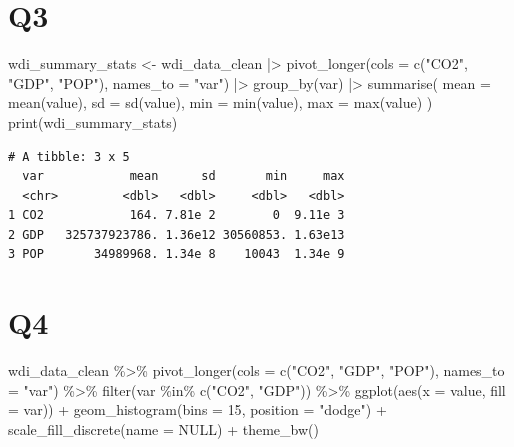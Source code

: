 \documentclass[
  letterpaper,
  DIV=11,
  numbers=noendperiod]{scrartcl}
\newenvironment{Shaded}{\begin{snugshade}}{\end{snugshade}}
\newcommand{\AttributeTok}[1]{\textcolor[rgb]{0.40,0.45,0.13}{#1}}
\newcommand{\ConstantTok}[1]{\textcolor[rgb]{0.56,0.35,0.01}{#1}}
\newcommand{\DecValTok}[1]{\textcolor[rgb]{0.68,0.00,0.00}{#1}}
\newcommand{\FunctionTok}[1]{\textcolor[rgb]{0.28,0.35,0.67}{#1}}
\newcommand{\NormalTok}[1]{\textcolor[rgb]{0.00,0.23,0.31}{#1}}
\newcommand{\OtherTok}[1]{\textcolor[rgb]{0.00,0.23,0.31}{#1}}
\newcommand{\SpecialCharTok}[1]{\textcolor[rgb]{0.37,0.37,0.37}{#1}}
\newcommand{\StringTok}[1]{\textcolor[rgb]{0.13,0.47,0.30}{#1}}
\begin{document}
\section{Q3}\label{q3}

\begin{Shaded}
\begin{Highlighting}[]
\NormalTok{wdi\_summary\_stats }\OtherTok{\textless{}{-}} 
\NormalTok{  wdi\_data\_clean }\SpecialCharTok{|\textgreater{}}
   \FunctionTok{pivot\_longer}\NormalTok{(}\AttributeTok{cols =} \FunctionTok{c}\NormalTok{(}\StringTok{"CO2"}\NormalTok{, }\StringTok{"GDP"}\NormalTok{, }\StringTok{"POP"}\NormalTok{), }\AttributeTok{names\_to =} \StringTok{"var"}\NormalTok{) }\SpecialCharTok{|\textgreater{}}
   \FunctionTok{group\_by}\NormalTok{(var) }\SpecialCharTok{|\textgreater{}}
   \FunctionTok{summarise}\NormalTok{(}
    \AttributeTok{mean =} \FunctionTok{mean}\NormalTok{(value),}
    \AttributeTok{sd =} \FunctionTok{sd}\NormalTok{(value),}
    \AttributeTok{min =} \FunctionTok{min}\NormalTok{(value),}
    \AttributeTok{max =} \FunctionTok{max}\NormalTok{(value)}
\NormalTok{   )}
\FunctionTok{print}\NormalTok{(wdi\_summary\_stats)}
\end{Highlighting}
\end{Shaded}

\begin{verbatim}
# A tibble: 3 x 5
  var            mean      sd       min     max
  <chr>         <dbl>   <dbl>     <dbl>   <dbl>
1 CO2            164. 7.81e 2        0  9.11e 3
2 GDP   325737923786. 1.36e12 30560853. 1.63e13
3 POP       34989968. 1.34e 8    10043  1.34e 9
\end{verbatim}

\section{Q4}\label{q4}

\begin{Shaded}
\begin{Highlighting}[]
\NormalTok{wdi\_data\_clean }\SpecialCharTok{\%\textgreater{}\%}
   \FunctionTok{pivot\_longer}\NormalTok{(}\AttributeTok{cols =} \FunctionTok{c}\NormalTok{(}\StringTok{"CO2"}\NormalTok{, }\StringTok{"GDP"}\NormalTok{, }\StringTok{"POP"}\NormalTok{), }\AttributeTok{names\_to =} \StringTok{"var"}\NormalTok{) }\SpecialCharTok{\%\textgreater{}\%}
  \FunctionTok{filter}\NormalTok{(var }\SpecialCharTok{\%in\%} \FunctionTok{c}\NormalTok{(}\StringTok{"CO2"}\NormalTok{, }\StringTok{"GDP"}\NormalTok{)) }\SpecialCharTok{\%\textgreater{}\%}
  \FunctionTok{ggplot}\NormalTok{(}\FunctionTok{aes}\NormalTok{(}\AttributeTok{x =}\NormalTok{ value, }\AttributeTok{fill =}\NormalTok{ var)) }\SpecialCharTok{+}
  \FunctionTok{geom\_histogram}\NormalTok{(}\AttributeTok{bins =} \DecValTok{15}\NormalTok{, }\AttributeTok{position =} \StringTok{"dodge"}\NormalTok{) }\SpecialCharTok{+}
  \FunctionTok{scale\_fill\_discrete}\NormalTok{(}\AttributeTok{name =} \ConstantTok{NULL}\NormalTok{) }\SpecialCharTok{+}
  \FunctionTok{theme\_bw}\NormalTok{()}
\end{Highlighting}
\end{Shaded}
\end{document}
